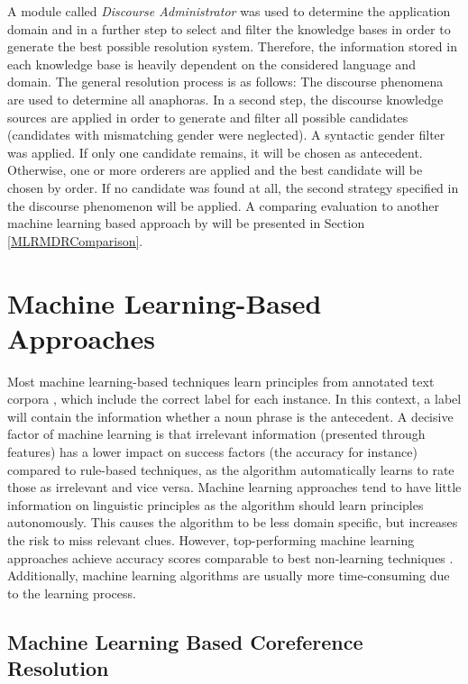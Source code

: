 A module called \textit{Discourse Administrator} was used to determine the application domain and in a further step to select and filter the knowledge bases in order to generate the best possible resolution system. Therefore, the information stored in each knowledge base is heavily dependent on the considered language and domain. The general resolution process is as follows: The discourse phenomena are used to determine all anaphoras. In a second step, the discourse knowledge sources are applied in order to generate and filter all possible candidates (candidates with mismatching gender were neglected). A syntactic gender filter was applied. If only one candidate remains, it will be chosen as antecedent. Otherwise, one or more orderers are applied and the best candidate will be chosen by order. If no candidate was found at all, the second strategy specified in the discourse phenomenon will be applied. A comparing evaluation to another machine learning based approach by \cite{aone1995evaluating} will be presented in Section \ref{MLRMDRComparison}.

\section{Machine Learning-Based Approaches}

Most machine learning-based techniques learn principles from annotated text corpora \citep{soon2001machine, bergsma2005automatic}, which include the correct label for each instance. In this context, a label will contain the information whether a noun phrase is the antecedent. A decisive factor of machine learning is that irrelevant information (presented through features) has a lower impact on success factors (the accuracy for instance) compared to rule-based techniques, as the algorithm automatically learns to rate those as irrelevant and vice versa. Machine learning approaches tend to have little information on linguistic principles as the algorithm should learn principles autonomously. This causes the algorithm to be less domain specific, but increases the risk to miss relevant clues. However, top-performing machine learning approaches achieve accuracy scores comparable to best non-learning techniques \citep{soon2001machine}. \\
Additionally, machine learning algorithms are usually more time-consuming due to the learning process.

\subsection{Machine Learning Based Coreference Resolution}
\label{soon2001traininginstances}

